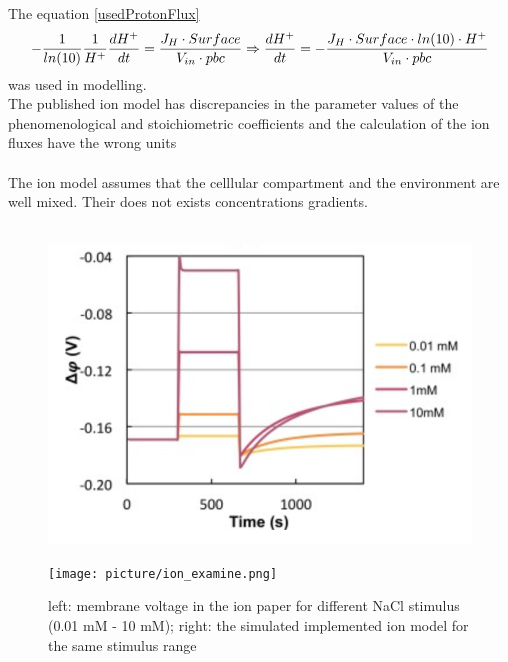 The equation \ref{usedProtonFlux} 
\begin{equation}\label{usedProtonFlux}
- \frac{1}{ln(10)} \frac{1}{H^+}\frac{dH^+}{dt} = \frac{J_H \cdot Surface}{V_{in} \cdot pbc}\\
\Rightarrow \frac{dH^+}{dt}=-\frac{J_H \cdot Surface \cdot ln(10) \cdot H^+}{V_{in} \cdot pbc}
\end{equation}
was used in modelling.\\
The published ion model has discrepancies in the parameter values of the phenomenological and stoichiometric coefficients and the calculation of the ion fluxes have the wrong units \\\\
The ion model assumes that the celllular compartment and the environment are well mixed. Their does not exists concentrations gradients. \\\\
\begin{figure}[htbp]
	
	\begin{minipage}{0,5\textwidth}
		
		\includegraphics[width=\textwidth]{picture/Ion_Paper.png}
		
		\label{IonPaper} 
	\end{minipage}
	\begin{minipage}{0,5\textwidth}
		
		\texttt{[image: picture/ion\_examine.png]}
		
		\label{IonImplemented} 
	\end{minipage}
	\caption{left: membrane voltage in the ion paper for different NaCl stimulus (0.01 mM - 10 mM); right: the simulated implemented ion model for the same stimulus range }
\end{figure}

